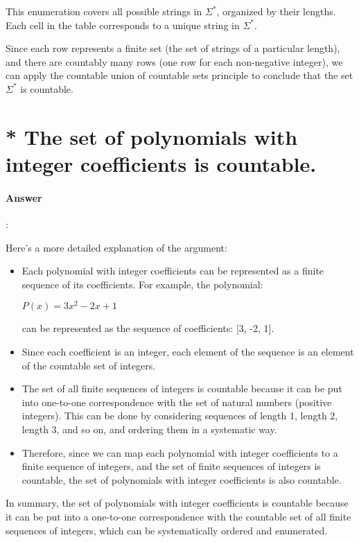 \documentclass{article}
\begin{document}
This enumeration covers all possible strings in $\Sigma^*$, organized by their lengths. Each cell in the table corresponds to a unique string in $\Sigma^*$.

Since each row represents a finite set (the set of strings of a particular length), and there are countably many rows (one row for each non-negative integer), we can apply the countable union of countable sets principle to conclude that the set $\Sigma^*$ is countable.


\section{* The set of polynomials with integer coeﬀicients is countable.}

\paragraph{Answer}:

Here's a more detailed explanation of the argument:

\begin{itemize}
  \item Each polynomial with integer coefficients can be represented as a finite sequence of its coefficients. For example, the polynomial:

  $P(x) = 3x^2 - 2x + 1$
  
  can be represented as the sequence of coefficients: [3, -2, 1].
  
  \item Since each coefficient is an integer, each element of the sequence is an element of the countable set of integers.
  
  \item The set of all finite sequences of integers is countable because it can be put into one-to-one correspondence with the set of natural numbers (positive integers). This can be done by considering sequences of length 1, length 2, length 3, and so on, and ordering them in a systematic way.
  
  \item Therefore, since we can map each polynomial with integer coefficients to a finite sequence of integers, and the set of finite sequences of integers is countable, the set of polynomials with integer coefficients is also countable.
\end{itemize}

In summary, the set of polynomials with integer coefficients is countable because it can be put into a one-to-one correspondence with the countable set of all finite sequences of integers, which can be systematically ordered and enumerated.
\end{document}
